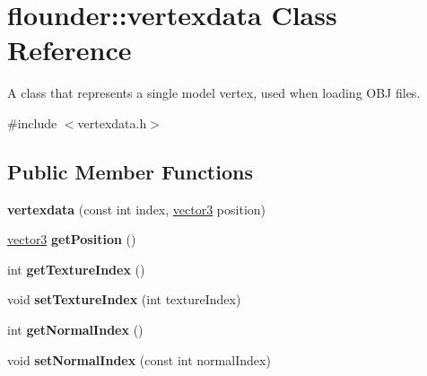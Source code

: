 \hypertarget{classflounder_1_1vertexdata}{}\section{flounder\+:\+:vertexdata Class Reference}
\label{classflounder_1_1vertexdata}


A class that represents a single model vertex, used when loading O\+BJ files.  




{\ttfamily \#include $<$vertexdata.\+h$>$}

\subsection*{Public Member Functions}
\begin{DoxyCompactItemize}
\item 
\mbox{\label{classflounder_1_1vertexdata_a8103c1f427f47cf525e7e36797482a28}} 
{\bfseries vertexdata} (const int index, \hyperlink{classflounder_1_1vector3}{vector3} position)
\item 
\mbox{\label{classflounder_1_1vertexdata_a8abf042f88e6508d49fd5cb9526f3c83}} 
\hyperlink{classflounder_1_1vector3}{vector3} {\bfseries get\+Position} ()
\item 
\mbox{\label{classflounder_1_1vertexdata_aa278e38948bfb19e530c18c48540d053}} 
int {\bfseries get\+Texture\+Index} ()
\item 
\mbox{\label{classflounder_1_1vertexdata_ae3465e492ba9d4afe163d64daff89932}} 
void {\bfseries set\+Texture\+Index} (int texture\+Index)
\item 
\mbox{\label{classflounder_1_1vertexdata_abfc67072c49c14d5b32a0a40c768ea71}} 
int {\bfseries get\+Normal\+Index} ()
\item 
\mbox{\label{classflounder_1_1vertexdata_a65c0ec8ab102a2e3c70c4d1d8841d55c}} 
void {\bfseries set\+Normal\+Index} (const int normal\+Index)
\item 
\mbox{\label{classflounder_1_1vertexdata_a327cec5468493906f425e00c43533e40}} 

\end{DoxyCompactItemize}
